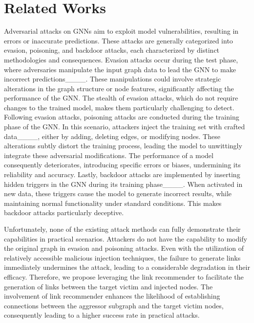 \section{Related Works}
Adversarial attacks on GNNs aim to exploit model vulnerabilities, resulting in errors or inaccurate predictions. These attacks are generally categorized into evasion, poisoning, and backdoor attacks, each characterized by distinct methodologies and consequences. Evasion attacks occur during the test phase, where adversaries manipulate the input graph data to lead the GNN to make incorrect predictions____. These manipulations could involve strategic alterations in the graph structure or node features, significantly affecting the performance of the GNN. The stealth of evasion attacks, which do not require changes to the trained model, makes them particularly challenging to detect. Following evasion attacks, poisoning attacks are conducted during the training phase of the GNN. In this scenario, attackers inject the training set with crafted data____, either by adding, deleting edges, or modifying nodes. These alterations subtly distort the training process, leading the model to unwittingly integrate these adversarial modifications. The performance of a model consequently deteriorates, introducing specific errors or biases, undermining its reliability and accuracy. Lastly, backdoor attacks are implemented by inserting hidden triggers in the GNN during its training phase____. When activated in new data, these triggers cause the model to generate incorrect results, while maintaining normal functionality under standard conditions. This makes backdoor attacks particularly deceptive.

Unfortunately, none of the existing attack methods can fully demonstrate their capabilities in practical scenarios. Attackers do not have the capability to modify the original graph in evasion and poisoning attacks. Even with the utilization of relatively accessible malicious injection techniques, the failure to generate links immediately undermines the attack, leading to a considerable degradation in their efficacy. Therefore, we propose leveraging the link recommender to facilitate the generation of links between the target victim and injected nodes. The involvement of link recommender enhances the likelihood of establishing connections between the aggressor subgraph and the target victim nodes, consequently leading to a higher success rate in practical attacks.